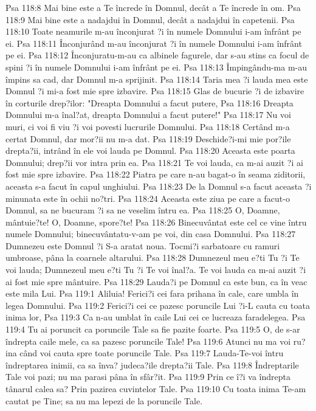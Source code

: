 Psa 118:8  Mai bine este a Te încrede în Domnul, decât a Te încrede în om.
Psa 118:9  Mai bine este a nadajdui în Domnul, decât a nadajdui în capetenii.
Psa 118:10  Toate neamurile m-au înconjurat ?i în numele Domnului i-am înfrânt pe ei.
Psa 118:11  Înconjurând m-au înconjurat ?i în numele Domnului i-am înfrânt pe ei.
Psa 118:12  Înconjuratu-m-au ca albinele fagurele, dar s-au stins ca focul de spini ?i în numele Domnului i-am înfrânt pe ei.
Psa 118:13  Împingându-ma m-au împins sa cad, dar Domnul m-a sprijinit.
Psa 118:14  Taria mea ?i lauda mea este Domnul ?i mi-a fost mie spre izbavire.
Psa 118:15  Glas de bucurie ?i de izbavire în corturile drep?ilor: "Dreapta Domnului a facut putere,
Psa 118:16  Dreapta Domnului m-a înal?at, dreapta Domnului a facut putere!"
Psa 118:17  Nu voi muri, ci voi fi viu ?i voi povesti lucrurile Domnului.
Psa 118:18  Certând m-a certat Domnul, dar mor?ii nu m-a dat.
Psa 118:19  Deschide?i-mi mie por?ile drepta?ii, intrând în ele voi lauda pe Domnul.
Psa 118:20  Aceasta este poarta Domnului; drep?ii vor intra prin ea.
Psa 118:21  Te voi lauda, ca m-ai auzit ?i ai fost mie spre izbavire.
Psa 118:22  Piatra pe care n-au bagat-o în seama ziditorii, aceasta s-a facut în capul unghiului.
Psa 118:23  De la Domnul s-a facut aceasta ?i minunata este în ochii no?tri.
Psa 118:24  Aceasta este ziua pe care a facut-o Domnul, sa ne bucuram ?i sa ne veselim întru ea.
Psa 118:25  O, Doamne, mântuie?te! O, Doamne, spore?te!
Psa 118:26  Binecuvântat este cel ce vine întru numele Domnului; binecuvântatu-v-am pe voi, din casa Domnului.
Psa 118:27  Dumnezeu este Domnul ?i S-a aratat noua. Tocmi?i sarbatoare cu ramuri umbroase, pâna la coarnele altarului.
Psa 118:28  Dumnezeul meu e?ti Tu ?i Te voi lauda; Dumnezeul meu e?ti Tu ?i Te voi înal?a. Te voi lauda ca m-ai auzit ?i ai fost mie spre mântuire.
Psa 118:29  Lauda?i pe Domnul ca este bun, ca în veac este mila Lui.
Psa 119:1  Aliluia! Ferici?i cei fara prihana în cale, care umbla în legea Domnului.
Psa 119:2  Ferici?i cei ce pazesc poruncile Lui ?i-L cauta cu toata inima lor,
Psa 119:3  Ca n-au umblat în caile Lui cei ce lucreaza faradelegea.
Psa 119:4  Tu ai poruncit ca poruncile Tale sa fie pazite foarte.
Psa 119:5  O, de s-ar îndrepta caile mele, ca sa pazesc poruncile Tale!
Psa 119:6  Atunci nu ma voi ru?ina când voi cauta spre toate poruncile Tale.
Psa 119:7  Lauda-Te-voi întru îndreptarea inimii, ca sa înva? judeca?ile drepta?ii Tale.
Psa 119:8  Îndreptarile Tale voi pazi; nu ma parasi pâna în sfâr?it.
Psa 119:9  Prin ce î?i va îndrepta tânarul calea sa? Prin pazirea cuvintelor Tale.
Psa 119:10  Cu toata inima Te-am cautat pe Tine; sa nu ma lepezi de la poruncile Tale.

